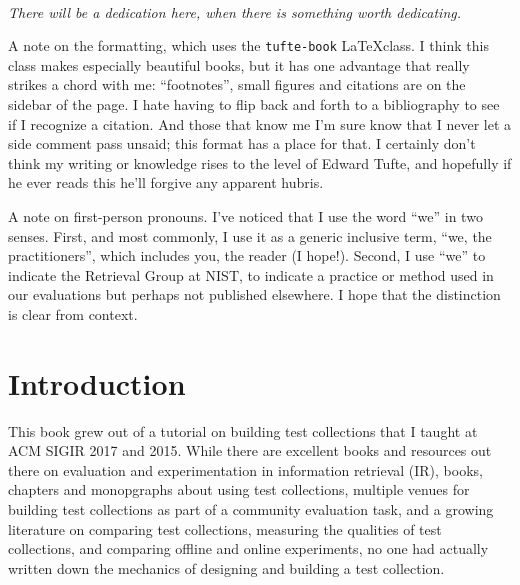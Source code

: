 \documentclass[nobib]{tufte-book}
\begin{document}
\setcounter{tocdepth}{1}
\tableofcontents



\cleardoublepage
~\vfill
\begin{doublespace}
\noindent\fontsize{18}{22}\selectfont\itshape
\nohyphenation
There will be a dedication here, when there is something worth dedicating.
\end{doublespace}
\vfill
\vfill

A note on the formatting, which uses the {\tt tufte-book} \LaTeX class.  I think this class makes especially beautiful books, but it has one advantage that really strikes a chord with me: ``footnotes'', small figures and citations are on the sidebar of the page.  I hate having to flip back and forth to a bibliography to see if I recognize a citation.  And those that know me I'm sure know that I never let a side comment pass unsaid; this format has a place for that.  I certainly don't think my writing or knowledge rises to the level of Edward Tufte, and hopefully if he ever reads this he'll forgive any apparent hubris.

A note on first-person pronouns.  I've noticed that I use the word ``we'' in two senses. First, and most commonly, I use it as a generic inclusive term, ``we, the practitioners'', which includes you, the reader (I hope!).  Second, I use ``we'' to indicate the Retrieval Group at NIST, to indicate a practice or method used in our evaluations but perhaps not published elsewhere.  I hope that the distinction is clear from context.

\cleardoublepage
\chapter*{Introduction}

This book grew out of a tutorial on building test collections that I taught at ACM SIGIR 2017 and 2015.  While there are excellent books and resources out there on evaluation and experimentation in information retrieval (IR), books, chapters and monopgraphs about using test collections, multiple venues for building test collections as part of a community evaluation task, and a growing literature on comparing test collections, measuring the qualities of test collections, and comparing offline and online experiments, no one had actually written down the mechanics of designing and building a test collection.
\end{document}

